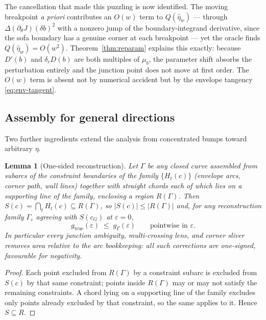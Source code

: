 \documentclass[11pt]{amsart}
\theoremstyle{plain}
\newtheorem{lemma}[theorem]{Lemma}
\theoremstyle{definition}
\newcommand{\cG}{c_{G}}
\begin{document}
The cancellation that made this puzzling is now identified.  The moving
breakpoint \emph{a priori} contributes an $O(w)$ term to
$Q(\hat\eta_{w})$ --- through $\Delta(\partial_{\theta}J)(\delta b)^{2}$
with a nonzero jump of the boundary-integrand derivative, since the sofa
boundary has a genuine corner at each breakpoint --- yet the oracle
finds $Q(\hat\eta_{w}) = O(w^{2})$.  Theorem~\ref{thm:reparam} explains
this exactly: because $D'(b)$ and $\delta_{c}D(b)$ are both multiples of
$\mu_{b}$, the parameter shift absorbs the perturbation entirely and the
junction point does not move at first order.  The $O(w)$ term is absent
not by numerical accident but by the envelope tangency
\eqref{eq:env-tangent}.

\subsection{Assembly for general directions}\label{sec:assembly}

Two further ingredients extend the analysis from concentrated bumps
toward arbitrary $\eta$.

\begin{lemma}[One-sided reconstruction]\label{lem:superset}
Let $\Gamma$ be any closed curve assembled from subarcs of the
constraint boundaries of the family $\{H_{t}(c)\}$ (envelope arcs,
corner path, wall lines) together with straight chords \emph{each of
which lies on a supporting line of the family}, enclosing a
region $R(\Gamma)$.  Then $S(c) = \bigcap_{t}H_{t}(c) \subseteq
R(\Gamma)$, so $|S(c)| \leq |R(\Gamma)|$ and, for any reconstruction
family $\Gamma_{\varepsilon}$ agreeing with $S(\cG)$ at
$\varepsilon = 0$,
\[
   g_{\mathrm{true}}(\varepsilon) \;\leq\; g_{\Gamma}(\varepsilon)
   \qquad\text{pointwise in } \varepsilon .
\]
In particular every junction ambiguity, multi-crossing lens, and corner
sliver \emph{removes} area relative to the arc bookkeeping: all such
corrections are one-signed, favourable for negativity.
\end{lemma}

\begin{proof}
Each point excluded from $R(\Gamma)$ by a constraint subarc is excluded
from $S(c)$ by that same constraint; points inside $R(\Gamma)$ may or
may not satisfy the remaining constraints.  A chord lying on a
supporting line of the family excludes only points already excluded by
that constraint, so the same applies to it.  Hence $S \subseteq R$.
\end{proof}
\end{document}

